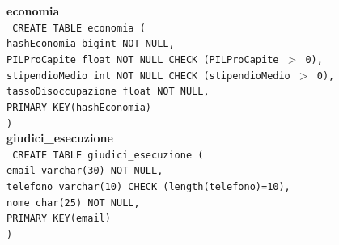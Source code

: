 \documentclass[a4paper,12pt]{report}
\begin{document}
                \newpage
                \noindent
                {\large \textbf{economia}} \\
                \texttt{
                    CREATE TABLE economia ( \\
                    \null\quad\quad hashEconomia bigint NOT NULL, \\
                    \null\quad\quad PILProCapite            float   NOT NULL CHECK (PILProCapite $>$ 0), \\
                    \null\quad\quad stipendioMedio          int     NOT NULL CHECK (stipendioMedio $>$ 0), \\
                    \null\quad\quad tassoDisoccupazione     float   NOT NULL, \\
                    \null\quad\quad PRIMARY KEY(hashEconomia) \\
                    )
                } \\

                \noindent
                {\large \textbf{giudici\_esecuzione}} \\
                \texttt{
                    CREATE TABLE giudici\_esecuzione ( \\
                    \null\quad\quad email      varchar(30)     NOT NULL, \\
                    \null\quad\quad telefono    varchar(10)     CHECK (length(telefono)=10), \\
                    \null\quad\quad nome        char(25)    NOT NULL, \\
                    \null\quad\quad PRIMARY KEY(email) \\
                    )
                } \\
\end{document}
